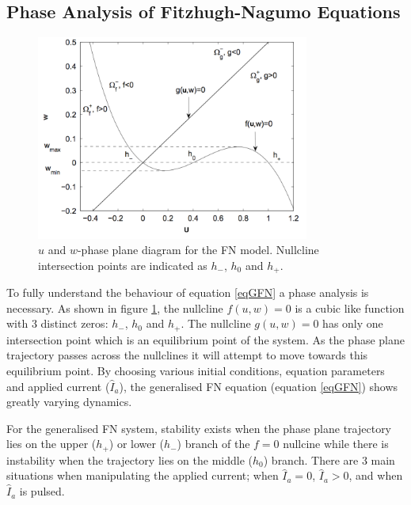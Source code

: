 \subsection{Phase Analysis of Fitzhugh-Nagumo Equations}
\begin{figure}[H]
    \centering
    \includegraphics[width=0.8\textwidth]{images/PhasediagramFN.png}
    \caption{$u$ and $w$-phase plane diagram for the FN model. Nullcline intersection points are indicated as $h_-$, $h_0$ and $h_+$. \citep{ecg}}
    \label{fig2b.1}
\end{figure}
To fully understand the behaviour of equation \ref{eqGFN} a phase analysis is necessary. As shown in figure \ref{fig2b.1}, the nullcline $f(u,w)=0$ is a cubic like function with 3 distinct zeros: $h_-$, $h_0$ and $h_+$. The nullcline $g(u,w)=0$ has only one intersection point which is an equilibrium point of the system. As the phase plane trajectory passes across the nullclines it will attempt to move towards this equilibrium point. By choosing various initial conditions, equation parameters and applied current ($\hat I_a$), the generalised FN equation (equation \ref{eqGFN}) shows greatly varying dynamics. \par
For the generalised FN system, stability exists when the phase plane trajectory lies on the upper ($h_+$) or lower ($h_-$) branch of the $f=0$ nullcine while there is instability when the trajectory lies on the middle ($h_0$) branch. There are 3 main situations when manipulating the applied current; when $\hat I_a = 0$, $\hat I_a > 0$, and when $\hat I_a$ is pulsed.

